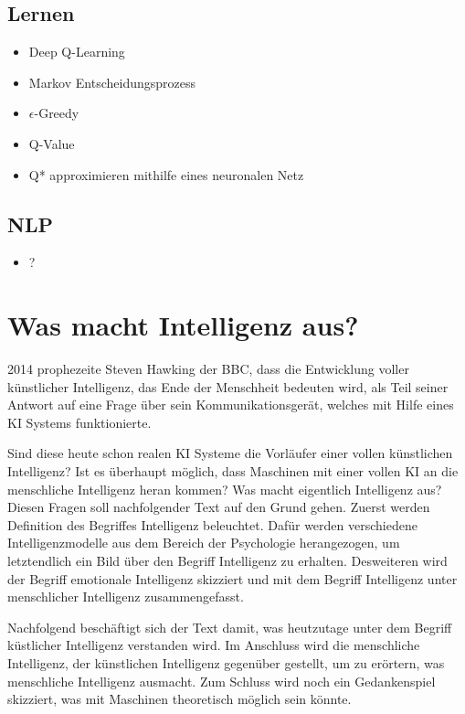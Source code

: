 \documentclass[a4paper, 11pt]{scrartcl}
\begin{document}
\subsection{Lernen}
\begin{itemize}
  \item Deep Q-Learning
  \item Markov Entscheidungsprozess
  \item $\epsilon$-Greedy
  \item Q-Value
  \item Q* approximieren mithilfe eines neuronalen Netz
\end{itemize}

\subsection{NLP}
\begin{itemize}
  \item ?
\end{itemize}

\newpage

\section{Was macht Intelligenz aus?}

2014 prophezeite Steven Hawking der BBC, dass die Entwicklung voller künstlicher Intelligenz, das Ende der Menschheit bedeuten wird, als Teil seiner Antwort auf eine Frage über sein Kommunikationsgerät, welches mit Hilfe eines KI Systems funktionierte.

Sind diese heute schon realen KI Systeme die Vorläufer einer vollen künstlichen Intelligenz? Ist es überhaupt möglich, dass Maschinen mit einer vollen KI an die menschliche Intelligenz heran kommen? Was macht eigentlich Intelligenz aus? Diesen Fragen soll nachfolgender Text auf den Grund gehen. Zuerst werden Definition des Begriffes Intelligenz beleuchtet. Dafür werden verschiedene Intelligenzmodelle aus dem Bereich der Psychologie herangezogen, um letztendlich ein Bild über den Begriff Intelligenz zu erhalten. Desweiteren wird der Begriff emotionale Intelligenz skizziert und mit dem Begriff Intelligenz unter menschlicher Intelligenz zusammengefasst.

Nachfolgend beschäftigt sich der Text damit, was heutzutage unter dem Begriff küstlicher Intelligenz verstanden wird. Im Anschluss wird die menschliche Intelligenz, der künstlichen Intelligenz gegenüber gestellt, um zu erörtern, was menschliche Intelligenz ausmacht. Zum Schluss wird noch ein Gedankenspiel skizziert, was mit Maschinen theoretisch möglich sein könnte.
\end{document}
